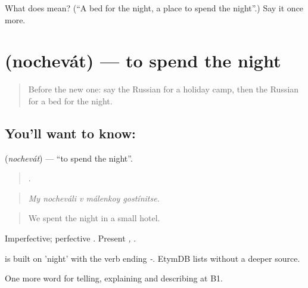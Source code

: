 \begin{tcolorbox}[breakable,colback=teal!4,colframe=teal!35!black,title={Before you move on}]
What does  mean? (\textquotedblleft{}A bed for the night, a place to spend the night\textquotedblright{}.) Say it once more.
\end{tcolorbox}
\section[\texorpdfstring{\ru{ночевать} (nochevát)}{ночевать (nochevát)}]{ (nochevát) — to spend the night}

\label{lesson:RU-C428-nochevat}



\begin{quote}
Before the new one: say the Russian for a holiday camp, then the Russian for a bed for the night.
\end{quote}

\subsection*{You'll want to know: }
\textbf{} (\emph{nochevát}) — \textquotedblleft{}to spend the night\textquotedblright{}.

\begin{quote}
    .
\end{quote}

\begin{quote}
\emph{My nocheváli v málenkoy gostínitse.}
\end{quote}

\begin{quote}
We spent the night in a small hotel.
\end{quote}

Imperfective; perfective \emph{}. Present \emph{, }.

\begin{cousinweb}
\emph{} is built on \emph{} 'night' with the verb ending \emph{-}. EtymDB lists \emph{} without a deeper source.
\end{cousinweb}

\begin{grammarlens}[title={What you've built}]
One more word for telling, explaining and describing at B1.
\end{grammarlens}

